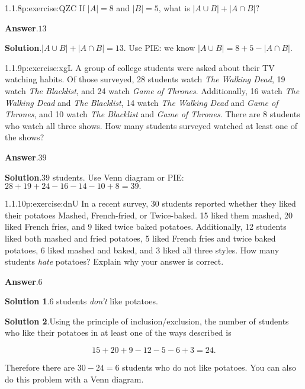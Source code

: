 \documentclass[twoside,11pt,]{book}
\newcommand{\blocktitlefont}{\relax}
\numberwithin{equation}{chapter}
\newcommand{\card}[1]{\left| #1 \right|}
\begin{document}
\begin{divisionsolution}{1.1.8}{}{p:exercise:QZC}%
If \(\card{A} = 8\) and \(\card{B} = 5\text{,}\) what is \(\card{A \cup B} + \card{A \cap B}\text{?}\)%
\par\smallskip%
\noindent\textbf{\blocktitlefont Answer}.\quad{}\(13\)%
\par\smallskip%
\noindent\textbf{\blocktitlefont Solution}.\quad{}\(\card{A \cup B} + \card{A \cap B} = 13\text{.}\) Use PIE: we know \(\card{A \cup B} = 8 + 5 - \card{A \cap B}\text{.}\)%
\end{divisionsolution}%
\begin{divisionsolution}{1.1.9}{}{p:exercise:xgL}%
A group of college students were asked about their TV watching habits. Of those surveyed, 28 students watch \emph{The Walking Dead}, 19 watch \emph{The Blacklist}, and 24 watch \emph{Game of Thrones}. Additionally, 16 watch \emph{The Walking Dead} and \emph{The Blacklist}, 14 watch \emph{The Walking Dead} and \emph{Game of Thrones}, and 10 watch \emph{The Blacklist} and \emph{Game of Thrones}. There are 8 students who watch all three shows. How many students surveyed watched at least one of the shows?%
\par\smallskip%
\noindent\textbf{\blocktitlefont Answer}.\quad{}\(39\)%
\par\smallskip%
\noindent\textbf{\blocktitlefont Solution}.\quad{}39 students. Use Venn diagram or PIE: \(28 + 19 + 24 - 16 - 14 - 10 + 8 = 39\text{.}\)%
\end{divisionsolution}%
\begin{divisionsolution}{1.1.10}{}{p:exercise:dnU}%
In a recent survey, 30 students reported whether they liked their potatoes Mashed, French-fried, or Twice-baked. 15 liked them mashed, 20 liked French fries, and 9 liked twice baked potatoes. Additionally, 12 students liked both mashed and fried potatoes, 5 liked French fries and twice baked potatoes, 6 liked mashed and baked, and 3 liked all three styles. How many students \emph{hate} potatoes? Explain why your answer is correct.%
\par\smallskip%
\noindent\textbf{\blocktitlefont Answer}.\quad{}\(6\)%
\par\smallskip%
\noindent\textbf{\blocktitlefont Solution 1}.\quad{}6 students \emph{don't} like potatoes.%
\par\smallskip%
\noindent\textbf{\blocktitlefont Solution 2}.\quad{}Using the principle of inclusion\slash{}exclusion, the number of students who like their potatoes in at least one of the ways described is%
\par
%
\begin{equation*}
15 + 20 + 9 - 12 - 5 - 6 + 3 = 24
\text{.}
\end{equation*}
%
\par
Therefore there are \(30-24 = 6\) students who do not like potatoes. You can also do this problem with a Venn diagram.%
\end{divisionsolution}%
\end{document}
